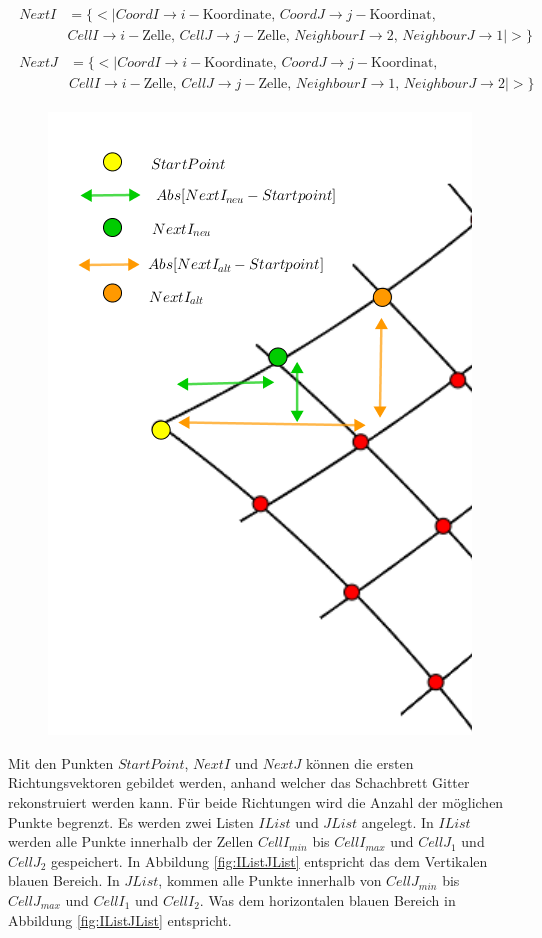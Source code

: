\begin{gather*}
	\begin{split}
		NextI &= \{ <|CoordI \rightarrow i-\text{Koordinate},\, CoordJ \rightarrow j-\text{Koordinat},\, \\
		&CellI \rightarrow i-\text{Zelle},\, CellJ \rightarrow j-\text{Zelle},\,
		NeighbourI \rightarrow 2, \,NeighbourJ \rightarrow 1  |>\}
	\end{split}\\
	\begin{split}
	NextJ &= \{ <|CoordI \rightarrow i-\text{Koordinate},\, CoordJ \rightarrow j-\text{Koordinat},\, \\
	&CellI \rightarrow i-\text{Zelle},\, CellJ \rightarrow j-\text{Zelle},\,
	NeighbourI \rightarrow 1, \,NeighbourJ \rightarrow 2 |>\}
\end{split}
\end{gather*}




\begin{figure}[!htb]
	\centering
	\includegraphics[width=0.5\linewidth]{images/SearchNextI.png}
	\caption[Überprüfung des gefundenen $NextI$]{}
	\label{fig:FindNextIJ}
\end{figure}


Mit den Punkten $StartPoint$, $NextI$ und $NextJ$ können die ersten Richtungsvektoren gebildet werden, anhand welcher das Schachbrett Gitter rekonstruiert werden kann. Für beide Richtungen wird die Anzahl der möglichen Punkte begrenzt. Es werden zwei Listen $IList$ und $JList$ angelegt. In $IList$ werden alle Punkte innerhalb der Zellen $CellI_{min}$ bis $CellI_{max}$ und $CellJ_1$ und $CellJ_2$ gespeichert. In Abbildung \ref{fig:IListJList} entspricht das dem Vertikalen blauen Bereich. In $JList$, kommen alle Punkte innerhalb von $CellJ_{min}$ bis $CellJ_{max}$ und $CellI_1$ und $CellI_2$. Was dem horizontalen blauen Bereich in Abbildung \ref{fig:IListJList} entspricht. \\

